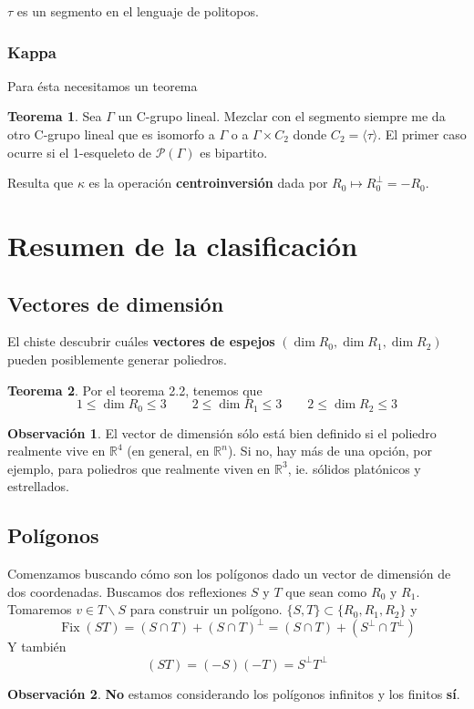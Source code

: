 \documentclass[spanish]{article}
\theoremstyle{definition}
\newtheorem*{obs}{Observación}
\newtheorem*{teo}{Teorema}
\newcommand{\R}{\mathbb{R}}
\newcommand{\p}{\mathcal{P}}
\DeclareMathOperator{\Fix}{Fix}
\begin{document}
$\tau$ es un segmento en el lenguaje de politopos.

\subsubsection{Kappa}
Para ésta necesitamos un teorema
\begin{teo}
	Sea $\Gamma$ un C-grupo lineal. Mezclar con el segmento siempre me da otro C-grupo lineal que es isomorfo a $\Gamma$ o a $\Gamma\times C_2$ donde $C_2=\langle\tau\rangle$. El primer caso ocurre si el 1-esqueleto de $\p(\Gamma)$ es bipartito.
\end{teo}

Resulta que $\kappa$ es la operación \textbf{centroinversión} dada por $R_0\mapsto R_0^\perp=-R_0$.

\section{Resumen de la clasificación}
\subsection{Vectores de dimensión}
El chiste descubrir cuáles \textbf{vectores de espejos} $(\dim R_0,\dim R_1,\dim R_2)$ pueden posiblemente generar poliedros.
\begin{teo}Por el teorema 2.2, tenemos que
\[1\leq\dim R_0\leq3\qquad2\leq\dim R_1\leq3\qquad2\leq\dim R_2\leq 3\]
\end{teo}
\begin{obs}
	El vector de dimensión sólo está bien definido si el poliedro realmente vive en $\R^4$ (en general, en $\R^n$). Si no, hay más de una opción, por ejemplo, para poliedros que realmente viven en $\R^3$, ie. sólidos platónicos y estrellados.
\end{obs}

\subsection{Polígonos}
Comenzamos buscando cómo son los polígonos dado un vector de dimensión de dos coordenadas. Buscamos dos reflexiones $S$ y $T$ que sean como $R_0$ y $R_1$. Tomaremos $v\in T\backslash S$ para construir un polígono.
$\{S,T\}\subset\{R_0,R_1,R_2\}$ y
\[\Fix(ST)=(S\cap T)+(S\cap T)^\perp=(S\cap T)+(S^\perp\cap T^\perp)\]
Y también
\[(ST)=(-S)(-T)=S^\perp T^\perp\]
\begin{obs}
	\textbf{No} estamos considerando los polígonos infinitos y los finitos \textbf{sí}.
\end{obs}
\end{document}

